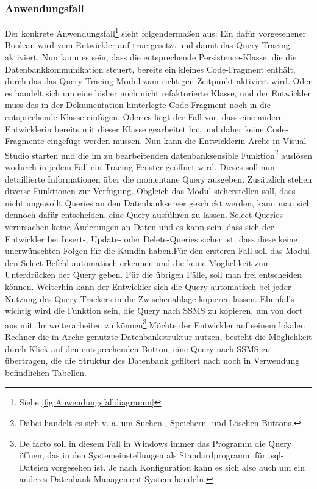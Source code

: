 \documentclass[11pt,toc=sectionentrywithoutdots, 
headheight=44pt, headings=optiontoheadandtoc, hyperfootnotes=false, hypertexnames=false]{scrartcl}
\newcommand\extendedref[1]{Siehe \ref{#1}}
\begin{document}
\subsubsection{Anwendungsfall}
Der konkrete Anwendungsfall\footnote{\extendedref{fig:Anwendungsfalldiagramm}} sieht folgendermaßen aus: Ein dafür vorgesehener \gls{Boolean} wird vom Entwickler auf \glqq true\grqq{} gesetzt und damit das Query-Tracing aktiviert. Nun kann es sein, dass die entsprechende Persistence-Klasse, die die Datenbankkommunikation steuert, bereits ein kleines Code-Fragment enthält, durch das das Query-Tracing-Modul zum richtigen Zeitpunkt aktiviert wird. Oder es handelt sich um eine bisher noch nicht refaktorierte Klasse, und der Entwickler muss das in der Dokumentation hinterlegte Code-Fragment noch in die entsprechende Klasse einfügen. Oder es liegt der Fall vor, dass eine andere Entwicklerin bereits mit dieser Klasse gearbeitet hat und daher keine Code-Fragmente eingefügt werden müssen. Nun kann die Entwicklerin Arche in Visual Studio starten und die im zu bearbeitenden datenbanksensible Funktion\footnote{Dabei handelt es sich v. a. um \glqq Suchen\grqq{}-, \glqq Speichern\grqq{}- und \glqq Löschen\grqq{}-Buttons.} auslösen wodurch in jedem Fall ein Tracing-Fenster geöffnet wird. Dieses soll nun detaillierte Informationen über die momentane Query ausgeben. Zusätzlich stehen diverse Funktionen zur Verfügung. Obgleich das Modul sicherstellen soll, dass nicht ungewollt Queries an den Datenbankserver geschickt werden, kann man sich dennoch dafür entscheiden, eine Query ausführen zu lassen. Select-Queries verursachen keine Änderungen an Daten und es kann sein, dass sich der Entwickler bei Insert-, Update- oder Delete-Queries sicher ist, dass diese keine unerwünschten Folgen für die Kundin haben.\newline\newline Für den ersteren Fall soll das Modul den Select-Befehl automatisch erkennen und die keine Möglichkeit zum Unterdrücken der Query geben. Für die übrigen Fälle, soll man frei entscheiden können. Weiterhin kann der Entwickler sich die Query automatisch bei jeder Nutzung des Query-Trackers in die Zwischenablage kopieren lassen. Ebenfalls wichtig wird die Funktion sein, die Query nach \acs{SSMS} zu kopieren, um von dort aus mit ihr weiterarbeiten zu können\footnote{De facto soll in diesem Fall in Windows immer das Programm die Query öffnen, das in den Systemeinstellungen als Standardprogramm für .sql-Dateien vorgesehen ist. Je nach Konfiguration kann es sich also auch um ein anderes \gls{Datenbank Management System} handeln.}.\newline Möchte der Entwickler auf seinem lokalen Rechner die in Arche genutzte Datenbankstruktur nutzen, besteht die Möglichkeit durch Klick auf den entsprechenden Button, eine Query nach SSMS zu übertragen, die die Struktur des Datenbank gefiltert nach noch in Verwendung befindlichen Tabellen.
\end{document}
